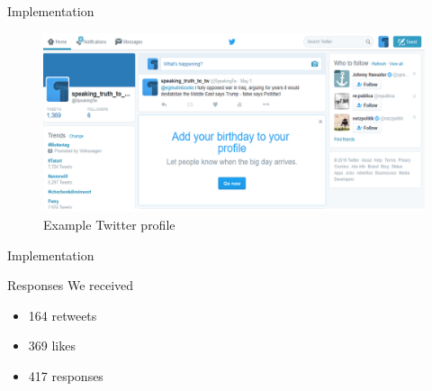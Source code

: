 \documentclass[10pt]{beamer}\usepackage[]{graphicx}\usepackage[]{color}
\begin{document}
\begin{frame}{Implementation}
		\begin{figure}
			\begin{centering}
  	\includegraphics[scale=.45]{twitter_page.PNG}
  \caption{Example Twitter profile}
  \label{fig:twit_prof}
			\end{centering}
		\end{figure}
\end{frame}


\begin{frame}{Implementation}
\begin{table}
		\begin{center}
	{\raggedleft\tiny
	
	}
	\end{center}
\end{table}	

\end{frame}

\begin{frame}{Responses}
  We received
  \begin{itemize}
    \item 164 retweets
    \item 369 likes
    \item 417 responses
  \end{itemize}
\end{frame}
\end{document}
